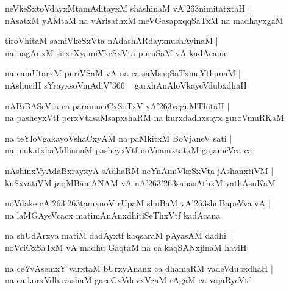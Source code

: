 \documentclass[twoside,12pt,openright]{book}
\def\S{\char'263}
\newcounter{shloka}[chapter]
\begin{document}
\begin{shloka}
neVkeSxtoVdayxMtamAditayxM shashinaM vA\S nimitatxtaH |\\
nAsatxM yAMtaM na vArisathxM meVGasapxqqSaTxM na madhayxgaM 
\end{shloka}

\begin{shloka}
tiroVhitaM samiVkeSxVta nAdashARdayxnushAyinaM |\\
na nagAnxM sitxrXyamiVkeSxVta puruSaM vA kadAcana
\end{shloka}

\begin{shloka}
na camUtarxM puriVSaM vA na ca saMsaqSaTxmeYthunaM |\\
nAshuciH sYrayxsoVmAdiV\char'366 ~ garxhAnAloVkayeVdubxdhaH 
\end{shloka}

\begin{shloka}
nABiBASeVta ca paramuciCxSoTxV vA\S vaguMThitaH |\\
na pasheyxVtf perxVtasaMsapxshaRM na kurxdadhxsayx guroVmuRKaM 
\end{shloka}

\begin{shloka}
na teYloVgakayoVshaCxyAM na paMkitxM BoVjaneV sati |\\
na mukatxbaMdhanaM pasheyxVtf noVnamxtatxM gajameVca ca 
\end{shloka}

\begin{shloka}
nAshinxVyAdaBxrayxyA sAdhaRM neYnAmiVkeSxVta jAshanxtiVM |\\
kuSxvatiVM jaqMBamANAM vA nA\S\S sanasAthxM yathAsuKaM 
\end{shloka}

\begin{shloka}
noVdake cA\S\S tamxnoV rUpaM shuBaM vA\S shuBapeVva vA |\\
na laMGAyeVcacx matimAnAnxdhitiSeThxVtf kadAcana 
\end{shloka}

\begin{shloka}
na shUdArxya matiM dadAyxtf kaqsaraM pAyasAM dadhi |\\
noVciCxSaTxM  vA madhu GaqtaM na ca kaqSANxjinaM haviH 
\end{shloka}

\begin{shloka}
na ceYvAsemxY varxtaM bUrxyAnanx ca dhamaRM vadeVdubxdhaH |\\
na ca korxVdhavashaM gaceCxVdevxVgaM rAgaM ca vajaRyeVtf 
\end{shloka}
\end{document}
